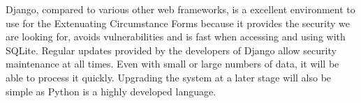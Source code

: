 \documentclass[../main.tex]{subfiles}
\begin{document}
\raggedright
Django, compared to various other web frameworks, is a excellent environment to use for the Extenuating Circumstance Forms because it provides the security we are looking for, avoids vulnerabilities and is fast when accessing and using with SQLite. Regular updates provided by the developers of Django allow security maintenance at all times. Even with small or large numbers of data, it will be able to process it quickly. Upgrading the system at a later stage will also be simple as Python is a highly developed language. 
\end{document}
